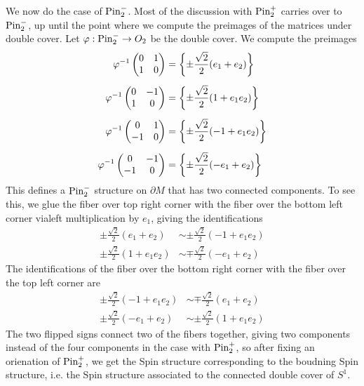 \begin{exmp}
We now do the case of $\mathrm{Pin}^-_2$. Most of the discussion with $\mathrm{Pin}^+_2$ carries
over to $\mathrm{Pin}^-_2$, up until the point where we compute the preimages of
the matrices under double cover. Let $\varphi : \mathrm{Pin}_2^- \to O_2$ be the
double cover. We compute the preimages
%
\begin{align*}
\varphi^{-1}\begin{pmatrix}
0 & 1 \\
1 & 0
\end{pmatrix} &= \left\lbrace \pm \frac{\sqrt{2}}{2}(e_1 + e_2) \right\rbrace \\[5pt]
\varphi^{-1}\begin{pmatrix}
0 & -1 \\
1 & 0
\end{pmatrix} &= \left\lbrace \pm\frac{\sqrt{2}}{2}(1 + e_1e_2) \right\rbrace \\[5pt]
\varphi^{-1}\begin{pmatrix}
0 & 1 \\
-1 & 0
\end{pmatrix} &= \left\lbrace \pm\frac{\sqrt{2}}{2}(-1 + e_1e_2) \right\rbrace \\[5pt]
\varphi^{-1}\begin{pmatrix}
0 & -1 \\
-1 & 0
\end{pmatrix} &= \left\lbrace \pm\frac{\sqrt{2}}{2}(-e_1 + e_2) \right\rbrace
\end{align*}
%
This defines a $\mathrm{Pin}^-_2$ structure on $\partial M$ that has two connected
components. To see this, we glue the fiber over top right corner
with the fiber over the bottom left corner vialeft multiplication by $e_1$,
giving the identifications
%
\begin{align*}
\pm \frac{\sqrt{2}}{2}(e_1 + e_2) &\sim \pm\frac{\sqrt{2}}{2}(-1 + e_1e_2) \\
\pm\frac{\sqrt{2}}{2}(1 + e_1e_2) &\sim \mp\frac{\sqrt{2}}{2}(-e_1 + e_2)
\end{align*}
%
The identifications of the fiber over the bottom right corner with the fiber
over the top left corner are
%
\begin{align*}
\pm\frac{\sqrt{2}}{2}(-1 + e_1e_2) &\sim \mp\frac{\sqrt{2}}{2}(e_1 + e_2)\\
\pm\frac{\sqrt{2}}{2}(-e_1 + e_2) &\sim \pm\frac{\sqrt{2}}{2}(1 + e_1e_2)
\end{align*}
The two flipped signs connect two of the fibers together, giving two components
instead of the four components in the case with $\mathrm{Pin}^+_2$, so after fixing
an orienation of $\mathrm{Pin}_2^+$, we get the Spin structure corresponding to the
boudning Spin structure, i.e. the Spin structure associated to the connected
double cover of $S^1$.
%
\end{exmp}
